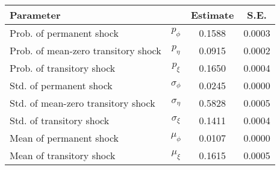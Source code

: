 \begin{tabular}{lccc} 
\toprule 
Parameter & & Estimate & S.E. \\ 
\midrule 
Prob. of permanent shock & $p_{\phi}$ &  0.1588 &  0.0003 \\ 
Prob. of mean-zero transitory shock & $p_{\eta}$ &  0.0915 &  0.0002 \\ 
Prob. of transitory shock & $p_{\xi}$ &  0.1650 &  0.0004 \\ 
Std. of permanent shock & $\sigma_{\phi}$ &  0.0245 &  0.0000 \\ 
Std. of mean-zero transitory shock & $\sigma_{\eta}$ &  0.5828 &  0.0005 \\ 
Std. of transitory shock & $\sigma_{\xi}$ &  0.1411 &  0.0004 \\ 
Mean of permanent shock & $\mu_{\phi}$ &  0.0107 &  0.0000 \\ 
Mean of transitory shock & $\mu_{\xi}$ &  0.1615 &  0.0005 \\ 
\bottomrule
\end{tabular}
